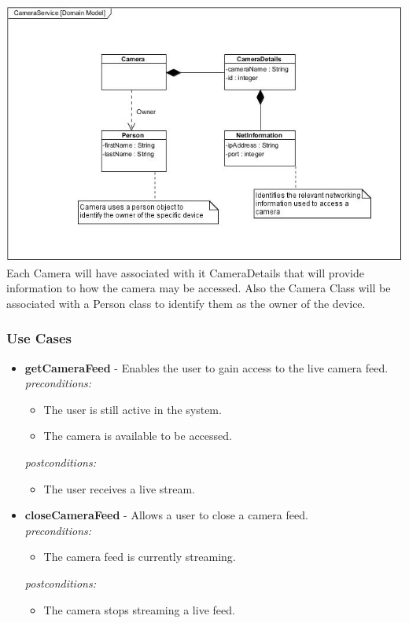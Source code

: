 \documentclass[a4paper,12pt]{article}
\begin{document}
	\includegraphics[width=1\textwidth]{./Pictures/UML/CameraServiceDomain.jpg}\\[1.5cm]	
	
	{\noindent}Each Camera will have associated with it CameraDetails that will provide information to how the camera may be accessed. Also the Camera Class will be associated with a Person class to identify them as the owner of the device.
	
	\newpage
	\subsubsection{Use Cases}
	
	\begin{itemize}
		\item \textbf{getCameraFeed} - Enables the user to gain access to the live camera feed.\\[0.5cm]
		\textit{preconditions:}
		\begin{itemize}
			\item The user is still active in the system.
			\item The camera is available to be accessed.
		\end{itemize}
		
		\textit{postconditions:}
		\begin{itemize}
			\item The user receives a live stream.\\[0.5cm]
		\end{itemize}
		
		\item \textbf{closeCameraFeed} - Allows a user to close a camera feed.\\[0.5cm]
		\textit{preconditions:}
		\begin{itemize}
			\item The camera feed is currently streaming.
		\end{itemize}
		
		\textit{postconditions:}
		\begin{itemize}
			\item The camera stops streaming a live feed.\\[0.5cm]
		\end{itemize}
	\end{itemize}
	
\end{document}
